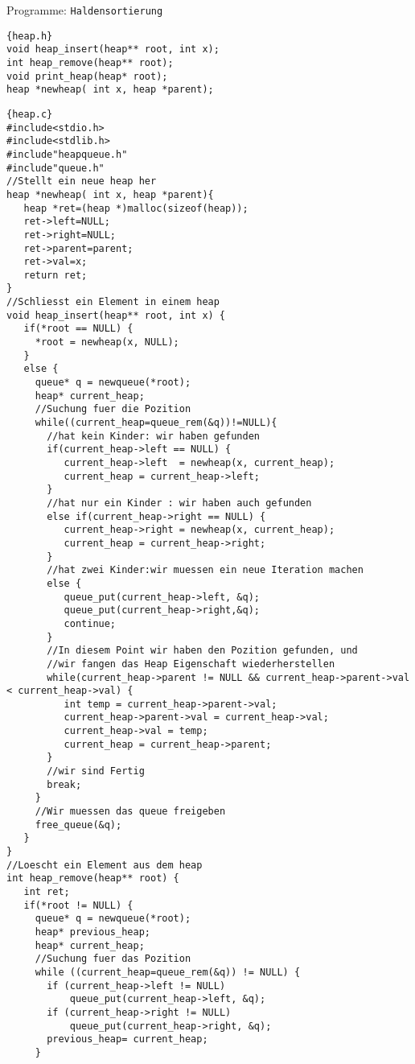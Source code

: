 \begin{myexampleprogram}{Programme: \texttt{Haldensortierung}}
\begin{lstlisting}{heap.h}
void heap_insert(heap** root, int x);
int heap_remove(heap** root);
void print_heap(heap* root);
heap *newheap( int x, heap *parent);
\end{lstlisting}
\begin{lstlisting}{heap.c}
#include<stdio.h>
#include<stdlib.h>
#include"heapqueue.h"
#include"queue.h"
//Stellt ein neue heap her
heap *newheap( int x, heap *parent){
   heap *ret=(heap *)malloc(sizeof(heap));
   ret->left=NULL;
   ret->right=NULL;
   ret->parent=parent;
   ret->val=x;
   return ret;
}
//Schliesst ein Element in einem heap
void heap_insert(heap** root, int x) {
   if(*root == NULL) {
     *root = newheap(x, NULL);
   }
   else {
     queue* q = newqueue(*root);
     heap* current_heap;
     //Suchung fuer die Pozition
     while((current_heap=queue_rem(&q))!=NULL){
       //hat kein Kinder: wir haben gefunden
       if(current_heap->left == NULL) {
          current_heap->left  = newheap(x, current_heap);
          current_heap = current_heap->left;
       }
       //hat nur ein Kinder : wir haben auch gefunden
       else if(current_heap->right == NULL) {
          current_heap->right = newheap(x, current_heap);
          current_heap = current_heap->right;
       }
       //hat zwei Kinder:wir muessen ein neue Iteration machen
       else {
          queue_put(current_heap->left, &q);
          queue_put(current_heap->right,&q);
          continue;
       }
       //In diesem Point wir haben den Pozition gefunden, und
       //wir fangen das Heap Eigenschaft wiederherstellen
       while(current_heap->parent != NULL && current_heap->parent->val < current_heap->val) {
          int temp = current_heap->parent->val;
          current_heap->parent->val = current_heap->val;
          current_heap->val = temp;
          current_heap = current_heap->parent;
       }
       //wir sind Fertig
       break;
     }
     //Wir muessen das queue freigeben
     free_queue(&q);
   }
}
//Loescht ein Element aus dem heap
int heap_remove(heap** root) {
   int ret;
   if(*root != NULL) {
     queue* q = newqueue(*root);
     heap* previous_heap;
     heap* current_heap;
     //Suchung fuer das Pozition
     while ((current_heap=queue_rem(&q)) != NULL) {
       if (current_heap->left != NULL)
           queue_put(current_heap->left, &q);
       if (current_heap->right != NULL)
           queue_put(current_heap->right, &q);
       previous_heap= current_heap;
     }

\end{lstlisting}
\end{myexampleprogram}
